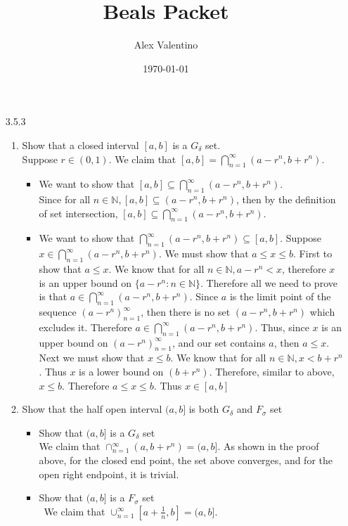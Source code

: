 \documentclass[12pt, letterpaper]{article}
\date{\today}
\author{Alex Valentino}
\title{Beals Packet}
\newcommand{\N}{\mathbb{N}}
\begin{document}
\begin{enumerate}
	\item[3.5.3]
	\begin{enumerate}
		\item Show that a closed interval $[a,b]$ is a $G_{\delta}$ set.\\
		Suppose $r \in (0,1)$.  We claim that $[a,b] = \bigcap_{n=1}^\infty (a-r^n, b+r^n)$.  
		\begin{itemize}
			\item We want to show that $[a,b] \subseteq \bigcap_{n=1}^\infty (a-r^n, b+r^n)$.  \\
		Since for all $n \in \N, [a,b] \subseteq (a-r^n, b+r^n)$, then by 
			the definition of set intersection, $[a,b] \subseteq \bigcap_{n=1}^\infty (a-r^n, b+r^n)$.  
			\item We want to show that $ \bigcap_{n=1}^\infty (a-r^n, b+r^n) \subseteq  [a,b]$.  Suppose $x \in \bigcap_{n=1}^\infty (a-r^n, b+r^n)$.  We
			must show that $a \leq x \leq b$.  First to show that $a \leq x$.
			We know that for all $n \in \N, a-r^n < x$, therefore $x$ is an upper bound on $\{a-r^n: n \in \N\}$.  Therefore all we need to prove is that $a \in \bigcap_{n=1}^\infty (a-r^n, b+r^n)$.  Since $a$ is the limit point of the sequence $(a - r^n)_{n=1}^\infty$, then there is no set $(a-r^n, b + r^n)$ which 
			excludes it.  Therefore $a \in \bigcap_{n=1}^\infty (a-r^n, b+r^n)$.
			Thus, since $x$ is an upper bound on $(a - r^n)_{n=1}^\infty$, and our
			set contains $a$, then $a \leq x$.\\
			Next we must show that $x \leq b$.  We know that for all $n \in \N, 
			x < b + r^n$.  Thus $x$ is a lower bound on $(b + r^n)$.  Therefore,
			similar to above, $x \leq b$.
			Therefore $a \leq x \leq b$.  Thus $x \in [a,b]$
		\end{itemize}
		\item Show that the half open interval $(a,b]$ is both $G_\delta$ and $F_\sigma$ set
		\begin{itemize}
			\item Show that $(a,b]$ is a $G_\delta$ set\\
			We claim that $\cap_{n=1}^\infty (a,b+r^n) = (a,b]$.  As shown in the proof above, for the closed end point, the set above converges, and for the open right endpoint, it is trivial.    
			\item Show that $(a,b]$ is a $F_\sigma$ set\\\
			We claim that $\cup_{n=1}^\infty [a + \frac{1}{n}, b] = (a,b]$.  \\

\end{itemize}
\end{enumerate}
\end{enumerate}
\end{document}
